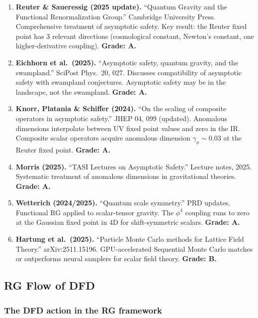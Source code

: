 \documentclass[11pt,a4paper]{article}
\begin{document}
\begin{enumerate}
\item \textbf{Reuter \& Saueressig (2025 update).} ``Quantum Gravity and the Functional Renormalization Group.'' Cambridge University Press. Comprehensive treatment of asymptotic safety. Key result: the Reuter fixed point has 3 relevant directions (cosmological constant, Newton's constant, one higher-derivative coupling). \textbf{Grade: A.}

\item \textbf{Eichhorn et al.\ (2025).} ``Asymptotic safety, quantum gravity, and the swampland.'' SciPost Phys.\ 20, 027. Discusses compatibility of asymptotic safety with swampland conjectures. Asymptotic safety may be in the landscape, not the swampland. \textbf{Grade: A.}

\item \textbf{Knorr, Platania \& Schiffer (2024).} ``On the scaling of composite operators in asymptotic safety.'' JHEP 04, 099 (updated). Anomalous dimensions interpolate between UV fixed point values and zero in the IR. Composite scalar operators acquire anomalous dimension $\gamma_\phi \sim 0.03$ at the Reuter fixed point. \textbf{Grade: A.}

\item \textbf{Morris (2025).} ``TASI Lectures on Asymptotic Safety.'' Lecture notes, 2025. Systematic treatment of anomalous dimensions in gravitational theories. \textbf{Grade: A.}

\item \textbf{Wetterich (2024/2025).} ``Quantum scale symmetry.'' PRD updates. Functional RG applied to scalar-tensor gravity. The $\phi^4$ coupling runs to zero at the Gaussian fixed point in 4D for shift-symmetric scalars. \textbf{Grade: A.}

\item \textbf{Hartung et al.\ (2025).} ``Particle Monte Carlo methods for Lattice Field Theory.'' arXiv:2511.15196. GPU-accelerated Sequential Monte Carlo matches or outperforms neural samplers for scalar field theory. \textbf{Grade: B.}
\end{enumerate}

\subsection{RG Flow of DFD}

\subsubsection{The DFD action in the RG framework}
\end{document}
